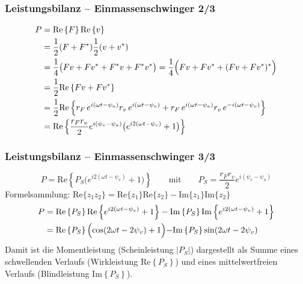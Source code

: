 \documentclass[hyperref={pdfpagemode=FullScreen, colorlinks=false}]{beamer}
\begin{document}
\begin{frame}
\frametitle{Leistungsbilanz {\normalsize -- Einmassenschwinger 2/3}}
 \begin{align*}
  P&=\mathrm{Re}\left\{F \right\}\mathrm{Re}\left\{v\right\}\\
  &=\frac{1}{2}(F+F^*)\frac{1}{2}(v+v^*)\\
  &=\frac{1}{4}\bigl(Fv+Fv^*+F^*v+F^*v^*\bigr)=\frac{1}{4}\Bigl(Fv+Fv^*+(Fv+Fv^*)^*\Bigr)\\
  &=\frac{1}{2}\mathrm{Re}\left\{Fv+Fv^*\right\}\\
  &=\frac{1}{2}\mathrm{Re}\left\{r_F\,e^{i(\omega t-\psi_a)} r_v\,e^{i(\omega t-\psi_v)}
  +r_F\,e^{i(\omega t-\psi_a)} r_v\,e^{-i(\omega t-\psi_v)} \right\}\\
  &=\mathrm{Re}\left\{\frac{r_F r_v}{2}e^{i(\psi_v-\psi_a)}
  \bigl( e^{i2(\omega t - \psi_v)} + 1  \bigr)
   \right\}\\
 \end{align*}

\end{frame}

\begin{frame}
\frametitle{Leistungsbilanz {\normalsize -- Einmassenschwinger 3/3}}
\begin{equation*}
   P=\mathrm{Re}\left\{P_S
  \bigl( e^{i2(\omega t - \psi_v)} + 1  \bigr) \right\} 
  \qquad
  \text{mit}
  \qquad
  P_S=\frac{r_F r_v}{2}e^{i(\psi_v-\psi_a)}
\end{equation*}
Formelsammlung: \quad $\mathrm{Re}\{z_1 z_2\}=\mathrm{Re}\{z_1\}\mathrm{Re}\{z_2\} - \mathrm{Im}\{z_1\}\mathrm{Im}\{z_2\}$
\begin{align*}
   P&=\mathrm{Re}\left\{P_S\right\}\mathrm{Re}\left\{ e^{i2(\omega t - \psi_v)} + 1  \right\}
   -\mathrm{Im}\left\{P_S\right\}\mathrm{Im}\left\{ e^{i2(\omega t - \psi_v)} + 1  \right\}\\
   &=\mathrm{Re}\left\{P_S\right\}\Bigl( \cos(2\omega t - 2\psi_v) + 1 \Bigl)
   -\mathrm{Im}\left\{P_S \right\} \sin(2\omega t- 2\psi_v)
\end{align*}
Damit ist die Momentleistung (Scheinleistung $|P_S|$) dargestellt als Summe eines schwellenden Verlaufs (Wirkleistung $\mathrm{Re}\left\{P_S\right\}$) und eines mittelwertfreien Verlaufs (Blindleistung $\mathrm{Im}\left\{P_S \right\}$). 

\end{frame}

\end{document}
